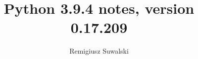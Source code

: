 \documentclass{charun}
\title{Python 3.9.4 notes, version 0.17.209}
\author{Remigiusz Suwalski}
\begin{document}
\begin{multicols*}{2}
\maketitle
\raggedright




































\end{multicols*}
\end{document}
